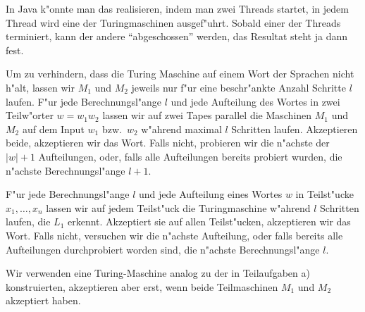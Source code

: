 \begin{loesung}
\begin{teilaufgaben}
In Java k"onnte man das realisieren, indem man zwei Threads startet,
in jedem Thread wird eine der Turingmaschinen ausgef"uhrt.
Sobald einer der Threads terminiert, kann der andere ``abgeschossen'' werden,
das Resultat steht ja dann fest.
\item
Um zu verhindern, dass die Turing Maschine auf einem Wort der
Sprachen nicht h"alt, lassen wir $M_1$ und $M_2$ jeweils nur f"ur eine
beschr"ankte Anzahl Schritte $l$ laufen.
F"ur jede Berechnungsl"ange $l$ und jede Aufteilung des Wortes in zwei
Teilw"orter $w=w_1w_2$ lassen wir auf zwei Tapes parallel die
Maschinen $M_1$ und $M_2$ auf dem Input $w_1$ bzw.~$w_2$ w"ahrend
maximal $l$ Schritten laufen.
Akzeptieren beide, akzeptieren wir das Wort.
Falls nicht, probieren wir die n"achste der $|w|+1$ Aufteilungen,
oder, falls alle Aufteilungen bereits probiert wurden, die n"achste
Berechnungsl"ange $l+1$.
\item
F"ur jede Berechnungsl"ange $l$ und
jede Aufteilung eines Wortes $w$ in Teilst"ucke $x_1,\dots,x_n$
lassen
wir auf jedem Teilst"uck die Turingmaschine w"ahrend $l$ Schritten
laufen, die
$L_1$ erkennt. Akzeptiert sie auf allen Teilst"ucken, akzeptieren wir
das Wort.
Falls nicht, versuchen wir die n"achste Aufteilung, oder falls
bereits alle Aufteilungen durchprobiert worden sind, die n"achste
Berechnungsl"ange $l$.
\item Wir verwenden eine Turing-Maschine analog zu der in Teilaufgaben a)
konstruierten, akzeptieren aber erst, wenn beide Teilmaschinen
$M_1$ und $M_2$ akzeptiert haben.
\qedhere
\end{teilaufgaben}
\end{loesung}
